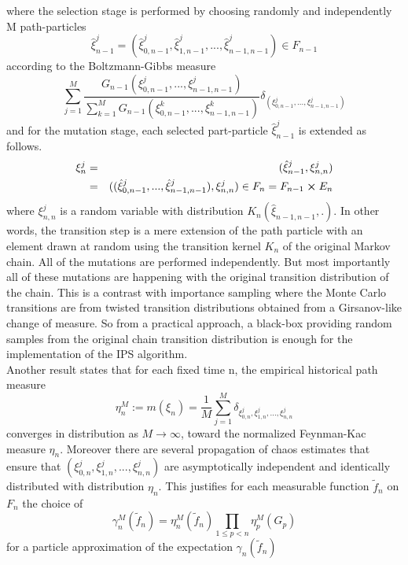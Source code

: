 where the selection stage is performed by choosing randomly and independently M path-particles
$$\hat{\xi}_{n-1}^j = (\hat{\xi}_{0,n-1}^j, \hat{\xi}_{1,n-1}^j,...,\hat{\xi}_{n-1,n-1}^j) \in F_{n-1}$$
according to the Boltzmann-Gibbs measure
\begin{equation}
	\sum_{j=1}^{M} \frac{G_{n-1}(\xi_{0,n-1}^j,...,\xi_{n-1,n-1}^j)}{\sum_{k=1}^{M}G_{n-1}(\xi_{0,n-1}^k,...,\xi_{n-1,n-1}^k)} \delta_{(\xi_{0,n-1}^j,...,\xi_{n-1,n-1}^j)}
\end{equation}
and for the mutation stage, each selected part-particle $\hat{\xi}_{n-1}^j$ is extended as follows.
\begin{eqnarray*}
	\xi_n^j & = & (\hat{\xi}_{n-1}^j, \xi_{n,n}^j)\\
	& = & ((\hat{\xi}_{0,n-1}^j,..., \hat{\xi}_{n-1,n-1}^j), \xi_{n,n}^j) \in F_n = F_{n-1} \cross E_n
\end{eqnarray*}
where $\xi_{n,n}^j$ is a random variable with distribution $K_n(\hat{\xi}_{n-1,n-1},.)$. In other words, the transition step is a mere extension of the path particle with an element drawn at random using the transition kernel $K_n$ of the original Markov chain. All of the mutations are performed independently. But most importantly all of these mutations are happening with the original transition distribution of the chain. This is a contrast with importance sampling where the Monte Carlo transitions are from twisted transition distributions obtained from a Girsanov-like change of measure. So from a practical approach, a black-box providing random samples from the original chain transition distribution is enough for the implementation of the IPS algorithm.\\

Another result states that for each fixed time n, the empirical historical path measure
$$\eta_n^M := m(\xi_n) = \frac{1}{M} \sum_{j=1}^{M} \delta_{\xi_{0,n}^j,\xi_{1,n}^j,...,\xi_{n,n}^j}$$ converges in distribution as $M \rightarrow \infty$, toward the normalized Feynman-Kac measure $\eta_n$. Moreover there are several propagation of chaos estimates that ensure that $(\xi_{0,n}^j, \xi_{1,n}^j,...,\xi_{n,n}^j)$ are asymptotically independent and identically distributed with distribution $\eta_n$. This justifies for each measurable function $\tilde{f}_n$ on $F_n$ the choice of
\begin{equation}
	\gamma_n^M(\tilde{f}_n) = \eta_n^M(\tilde{f}_n) \prod_{1\leq p <n}\eta_p^M(G_p)
\end{equation}
for a particle approximation of the expectation $\gamma_n(\tilde{f}_n)$

